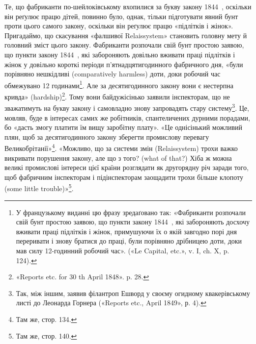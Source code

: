 \noindent{}Те, що фабриканти по-шейлоківському вхопилися за букву
закону 1844~, оскільки він реґулює працю дітей, повинно було,
однак, тільки підготувати явний бунт проти цього самого закону,
оскільки він реґулює працю «підлітків і жінок». Пригадаймо, що
скасування «фалшивої Relaissystem» становить головну мету
й головний зміст цього закону. Фабриканти розпочали свій бунт
простою заявою, що пункти закону 1844~, які забороняють довільно
вживати праці підлітків і жінок у довільно короткі
періоди п’ятнадцятигодинного фабричного дня, «були порівняно
нешкідливі (comparatively harmless) доти, доки робочий час
обмежувано 12 годинами\footnote*{
У французькому виданні цю фразу зредаґовано так: «Фабриканти
розпочали свій бунт простою заявою, що пункти закону 1844~, які забороняють
досхочу вживати праці підлітків і жінок, примушуючи їх о якій
завгодно порі дня переривати і знову братися до праці, були порівняно
дрібницею доти, доки мав силу 12-годинний робочий час». («Le Capital,
etc.», v. I, ch. X, p. 124). 
}. Але за десятигодинного закону вони
є нестерпна кривда» (hardship)\footnote{
«Reports etc. for 30 th April 1848». p. 28.
}. Тому вони байдужісінько
заявили інспекторам, що не зважатимуть на букву закону і
самовладно знову запровадять стару систему\footnote{
Так, між іншим, заявив філантроп Ешворд у своєму огидному
квакерівському листі до Леонарда Горнера («Reports etc., April 1849»,
р. 4).
}. Це, мовляв,
буде в інтересах самих же робітників, спантеличених дурними
порадами, бо «дасть змогу платити їм вищу заробітну плату».
«Це однісінький можливий плян, щоб за десятигодинного закону
зберегти промислову перевагу Великобрітанії»\footnote{
Там же, стор. 134.
}. «Можливо,
що за системи змін (Relaissystem) трохи важко викривати порушення
закону, але що з того? (what of that?) Хіба ж можна
великі промислові інтереси цієї країни розглядати як другорядну
річ заради того, щоб фабричним інспекторам і підінспекторам
заощадити трохи більше клопоту (some little trouble)»\footnote{
Там же, стор. 140.
}.
